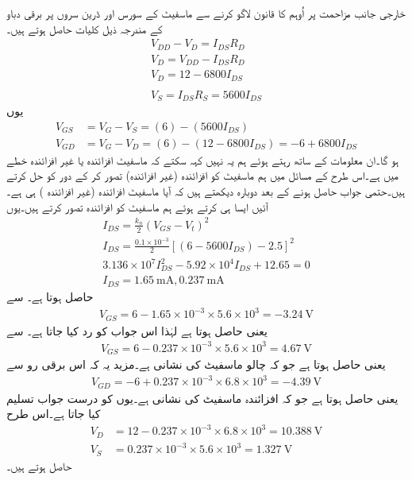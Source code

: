 خارجی جانب مزاحمت پر اُوہم کا قانون لاگو کرنے سے ماسفیٹ کے سورس اور ڈرین سروں پر برقی دباو کے مندرجہ ذیل کلیات حاصل ہوتے ہیں۔
\begin{align*}
V_{DD}-V_{D}=I_{DS}R_D\\
V_D=V_{DD}-I_{DS}R_D\\
V_D=12  - 6800 I_{DS}\\
\\
V_S=I_{DS}R_S=5600I_{DS}
\end{align*}
یوں
\begin{align*}
V_{GS}&=V_G -V_S = (6)-(5600 I_{DS})\\
V_{GD}&=V_G -V_D = (6)-\left(12-6800I_{DS} \right )=-6+6800I_{DS}
\end{align*}
ہو گا۔ان معلومات کے ساتھ رہتے ہوئے ہم یہ نہیں کہہ سکتے کہ ماسفیٹ افزائندہ یا غیر افزائندہ خطے میں ہے۔اس طرح کے مسائل میں ہم ماسفیٹ کو افزائندہ (غیر افزائندہ) تصور کر کے دور کو حل کرتے ہیں۔حتمی جواب حاصل ہونے کے بعد دوبارہ دیکھتے ہیں کہ آیا ماسفیٹ افزائندہ (غیر افزائندہ ) ہی ہے۔آئیں ایسا ہی کرتے ہوئے ہم ماسفیٹ کو افزائندہ تصور کرتے ہیں۔یوں
\begin{align*}
I_{DS}=\frac{k_n}{2} \left (V_{GS}-V_t \right )^{2}\\
I_{DS}=\frac{0.1 \times 10^{-3}}{2} \left[\left(6-5600 I_{DS}\right)-2.5 \right ]^2 \\
3.136 \times 10^{7} I_{DS}^{2}-5.92 \times 10^{4} I_{DS}+12.65=0\\
I_{DS}=\SI{1.65}{\milli \ampere} , \SI{0.237}{\milli \ampere}
\end{align*}
حاصل ہوتا ہے۔   سے 
\begin{align*}
V_{GS}=6-1.65 \times 10^{-3} \times 5.6 \times 10^{3}=\SI{-3.24}{\volt}
\end{align*}
یعنی   حاصل ہوتا ہے لہٰذا اس جواب کو رد کیا جاتا ہے۔  سے
\begin{align*}
V_{GS}=6-0.237 \times 10^{-3} \times 5.6 \times 10^{3}=\SI{4.67}{\volt}
\end{align*}
یعنی   حاصل ہوتا ہے جو کہ چالو ماسفیٹ کی نشانی ہے۔مزید یہ کہ اس برقی رو سے
\begin{align*}
V_{GD}=-6+0.237 \times 10^{-3} \times 6.8 \times 10^{3}=\SI{-4.39}{\volt}
\end{align*}
یعنی  حاصل ہوتا ہے جو کہ افزائندہ ماسفیٹ کی نشانی ہے۔یوں     کو درست جواب تسلیم کیا جاتا ہے۔اس طرح
\begin{align*}
V_D&=12-0.237 \times 10^{-3} \times 6.8 \times 10^{3}=\SI{10.388}{\volt}\\
V_S&=0.237 \times 10^{-3} \times 5.6 \times 10^{3}=\SI{1.327}{\volt}
\end{align*}
حاصل ہوتے ہیں۔


